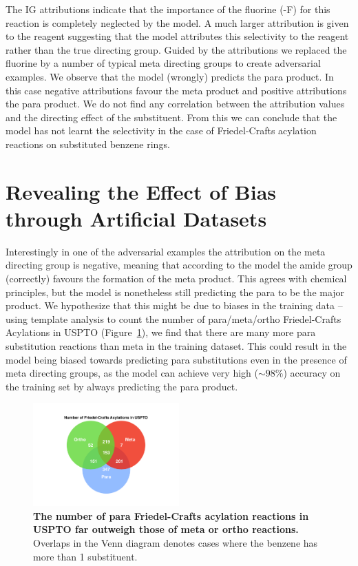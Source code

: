 The IG attributions indicate that the importance of the fluorine (-F) for this reaction is completely neglected by the model. A much larger attribution is given to the reagent suggesting that the model attributes this selectivity to the reagent rather than the true directing group. Guided by the attributions we replaced the fluorine by a number of typical meta directing groups to create adversarial examples. We observe that the model (wrongly) predicts the para product. In this case negative attributions favour the meta product and positive attributions the para product. We do not find any correlation between the attribution values and the directing effect of the substituent. From this we can conclude that the model has not learnt the selectivity in the case of Friedel-Crafts acylation reactions on substituted benzene rings. 

\section{Revealing the Effect of Bias through Artificial Datasets}
Interestingly in one of the adversarial examples the attribution on the meta directing group is negative, meaning that according to the model the amide group (correctly) favours the formation of the meta product. This agrees with chemical principles, but the model is nonetheless still predicting the para to be the major product. We hypothesize that this might be due to biases in the training data -- using template analysis to count the number of para/meta/ortho Friedel-Crafts Acylations in USPTO (Figure~\ref{fig:venn_friedel}), we find that there are many more para substitution reactions than meta in the training dataset. This could result in the model being biased towards predicting para substitutions even in the presence of meta directing groups, as the model can achieve very high ($\sim 98\%$) accuracy on the training set by always predicting the para product.

\begin{figure}[htb!] 
    \centering    
    \includegraphics[width=0.5\textwidth]{Chapters/Transformer/Figs/venn.pdf}
    \caption{ \textbf{The number of para Friedel-Crafts acylation reactions in USPTO far outweigh those of meta or ortho reactions.} Overlaps in the Venn diagram denotes cases where the benzene has more than 1 substituent.}
    \label{fig:venn_friedel}
\end{figure}

